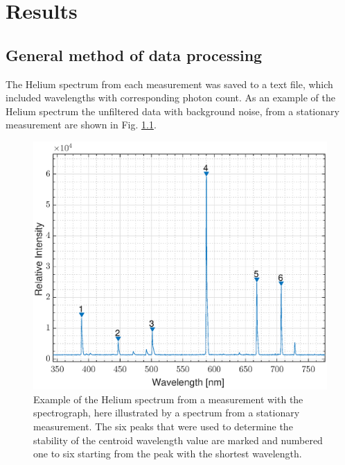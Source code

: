 \chapter{Results}

\section{General method of data processing}

The Helium spectrum from each measurement was saved to a text file, which included wavelengths with corresponding photon count. As an example of the Helium spectrum the unfiltered data with background noise, from a stationary measurement are shown in Fig. \ref{fig: demo data with noise}. 

\begin{figure}[h!]
\centering
\includegraphics[width=\linewidth]{figures/spectrum_with_noise_numbered.eps}
\caption{Example of the Helium spectrum from a measurement with the spectrograph, here illustrated by a spectrum from a stationary measurement. The six peaks that were used to determine the stability of the centroid wavelength value are marked and numbered one to six starting from the peak with the shortest wavelength.}
\label{fig: demo data with noise}
\end{figure}




